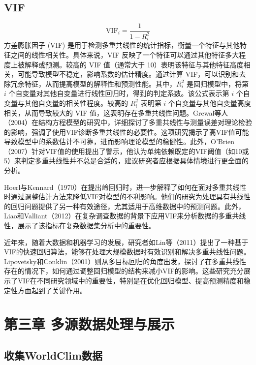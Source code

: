 \documentclass{article}
\begin{document}
	\subsection{VIF}
	
	\[
	\text{VIF}_i = \frac{1}{1 - R_i^2}
	\]
	方差膨胀因子 (VIF) 是用于检测多重共线性的统计指标，衡量一个特征与其他特征之间的线性相关性。具体来说，VIF 反映了一个特征可以通过其他特征多大程度上被解释或预测。较高的 VIF 值（通常大于 10）表明该特征与其他特征高度相关，可能导致模型不稳定，影响系数的估计精度。通过计算 VIF，可以识别和去除冗余特征，从而提高模型的解释性和预测性能。其中，$R_i^2$ 是回归模型中，将第 $i$ 个自变量对其他自变量进行线性回归时，得到的判定系数。该公式表示第 $i$ 个自变量与其他自变量的相关性程度。较高的 $R_i^2$ 表明第 $i$ 个自变量与其他自变量高度相关，从而导致较大的 VIF 值，这表明存在多重共线性问题。Grewal等人（2004）在结构方程模型的研究中，详细探讨了多重共线性与测量误差对理论检验的影响，强调了使用VIF诊断多重共线性的必要性。这项研究揭示了高VIF值可能导致模型中的系数估计不可靠，进而影响理论模型的稳健性。此外，O’Brien（2007）针对VIF值的使用提出了警示，他认为单纯依赖既定的VIF阈值（如10或5）来判定多重共线性并不总是合适的，建议研究者应根据具体情境进行更全面的分析。
	
	Hoerl与Kennard（1970）在提出岭回归时，进一步解释了如何在面对多重共线性时通过调整估计方法来降低VIF对模型的不利影响。他们的研究为处理具有共线性的回归问题提供了另一种有效途径，尤其适用于高维数据中的预测问题。此外，Liao和Valliant（2012）在复杂调查数据的背景下应用VIF来分析数据的多重共线性，展示了该指标在复杂数据集分析中的重要性。
	
	近年来，随着大数据和机器学习的发展，研究者如Lin等（2011）提出了一种基于VIF的快速回归算法，能够在处理大规模数据时有效识别和解决多重共线性问题。Lipovetsky和Conklin（2001）则从多目标回归的角度出发，探讨了在多重共线性存在的情况下，如何通过调整回归模型的结构来减小VIF的影响。这些研究充分展示了VIF在不同研究领域中的重要性，特别是在优化回归模型、提高预测精度和稳定性方面起到了关键作用。
	
	\section{第三章 多源数据处理与展示}
	
	
	
	\subsection{收集WorldClim数据}
	
\end{document}
